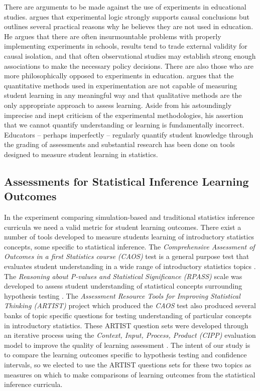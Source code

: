 \documentclass[11pt]{isuthesis}\usepackage[]{graphicx}\usepackage[]{color}
\begin{document}
There are arguments to be made against the use of experiments in educational studies. \citet{Cook2002} argues that experimental logic strongly supports causal conclusions but outlines several practical reasons why he believes they are not used in education.  He argues that there are often insurmountable problems with properly implementing experiments in schools, results tend to trade external validity for causal isolation, and that often observational studies may establish strong enough associations to make the necessary policy decisions. There are also those who are more philosophically opposed to experiments in education. \citet{Howe2004} argues that the quantitative methods used in experimentation are not capable of measuring student learning in any meaningful way and that qualitative methods are the only appropriate approach to assess learning. Aside from his astoundingly imprecise and inept criticism of the experimental methodologies, his assertion that we cannot quantify understanding or learning is fundamentally incorrect. Educators -- perhaps imperfectly -- regularly quantify student knowledge through the grading of assessments and substantial research has been done on tools designed to measure student learning in statistics.

\subsection{Assessments for Statistical Inference Learning Outcomes} 

In the experiment comparing simulation-based and traditional statistics inference curricula we need a valid metric for student learning outcomes. There exist a number of tools developed to measure students learning of introductory statistics concepts, some specific to statistical inference. The \textit{Comprehensive Assessment of Outcomes in a first Statistics course (CAOS)} test is a general purpose test that evaluates student understanding in a wide range of introductory statistics topics \citep{DelMas2007}. The \textit{Reasoning about P-values and Statistical Significance (RPASS)} scale was developed to assess student understanding of statistical concepts surrounding hypothesis testing \citep{LaneGetaz2013}. The \textit{Assessment Resource Tools for Improving Statistical Thinking (ARTIST)} project which produced the \textit{CAOS} test also produced several banks of topic specific questions for testing understanding of particular concepts in introductory statistics. These ARTIST question sets were developed through an iterative process using the \textit{Context, Input, Process, Product (CIPP)} evaluation model to improve the quality of learning assessment \citep{Ooms2008}. The intent of our study is to compare the learning outcomes specific to hypothesis testing and confidence intervals, so we elected to use the ARTIST questions sets for these two topics as measures on which to make comparisons of learning outcomes from the statistical inference curricula. 
\end{document}
